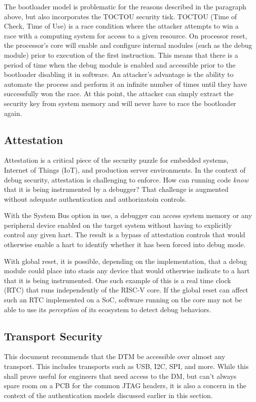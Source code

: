 The bootloader model is problematic for the reasons described in the paragraph above, but also incorporates the TOCTOU security tisk. TOCTOU (Time of Check, Time of Use) is a race condition where the attacker attempts to win a race with a computing system for access to a given resource. On processor reset, the processor's core will enable and configure internal modules (such as the debug module) prior to execution of the first instruction. This means that there is a period of time when the debug module is enabled and accessible prior to the bootloader disabling it in software. An attacker's advantage is the ability to automate the process and perform it an infinite number of times until they have successfully won the race. At this point, the attacker can simply extract the security key from system memory and will never have to race the bootloader again. 

\subsection{Attestation}
Attestation is a critical piece of the security puzzle for embedded systems, Internet of Things (IoT), and production server environments. In the context of debug security, attestation is challenging to enforce. How can running code {\em know} that it is being instrumented by a debugger? That challenge is augmented without adequate authentication and authorizatoin controls. 

With the System Bus option in use, a debugger can access system memory or any peripheral device enabled on the target system without having to explicitly control any given hart. The result is a bypass of attestation controls that would otherwise enable a hart to identify whether it has been forced into debug mode. 

With global reset, it is possible, depending on the implementation, that a debug module could place into stasis any device that would otherwise indicate to a hart that it is being instrumented. One such example of this is a real time clock (RTC) that runs independently of the RISC-V core. If the global reset can affect such an RTC implemented on a SoC, software running on the core may not be able to use its {\em perception} of its ecosystem to detect debug behaviors. 

\subsection{Transport Security}
This document recommends that the DTM be accessible over almost any transport. This includes transports such as USB, I2C, SPI, and more. While this shall prove useful for engineers that need access to the DM, but can't always spare room on a PCB for the common JTAG headers, it is also a concern in the context of the authentication models discussed earlier in this section. 

